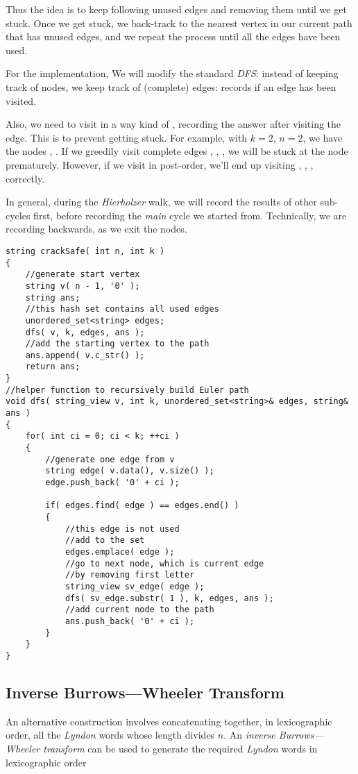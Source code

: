 Thus the idea is to keep following unused edges and removing them until we get stuck. Once we get stuck, we back-track to the nearest vertex in our current path that has unused edges, and we repeat the process until all the edges have been used.

For the implementation, We will modify the standard \textit{DFS}: instead of keeping track of nodes, we keep track of (complete) edges:  records if an edge has been visited.

Also, we need to visit in a way kind of , recording the answer after visiting the edge. This is to prevent getting stuck. For example, with $k = 2$, $n = 2$, we have the nodes , . If we greedily visit complete edges , , , we will be stuck at the node  prematurely. However, if we visit in post-order, we'll end up visiting , , ,  correctly.

In general, during the \textit{Hierholzer} walk, we will record the results of other sub-cycles first, before recording the \textit{main} cycle we started from. Technically, we are recording backwards, as we exit the nodes.

\setcounter{lstlisting}{0}
\begin{lstlisting}[style=customc, caption={Hierholzer Algorithm}]
string crackSafe( int n, int k )
{
    //generate start vertex
    string v( n - 1, '0' );
    string ans;
    //this hash set contains all used edges
    unordered_set<string> edges;
    dfs( v, k, edges, ans );
    //add the starting vertex to the path
    ans.append( v.c_str() );
    return ans;
}
//helper function to recursively build Euler path
void dfs( string_view v, int k, unordered_set<string>& edges, string& ans )
{
    for( int ci = 0; ci < k; ++ci )
    {
        //generate one edge from v
        string edge( v.data(), v.size() );
        edge.push_back( '0' + ci );

        if( edges.find( edge ) == edges.end() )
        {
            //this edge is not used
            //add to the set
            edges.emplace( edge );
            //go to next node, which is current edge
            //by removing first letter
            string_view sv_edge( edge );
            dfs( sv_edge.substr( 1 ), k, edges, ans );
            //add current node to the path
            ans.push_back( '0' + ci );
        }
    }
}
\end{lstlisting}

\subsection{Inverse Burrows—Wheeler Transform}
An alternative construction involves concatenating together, in lexicographic order, all the \textit{Lyndon} words whose length divides $n$. An \textit{inverse Burrows—Wheeler transform} can be used to generate the required \textit{Lyndon} words in lexicographic order
